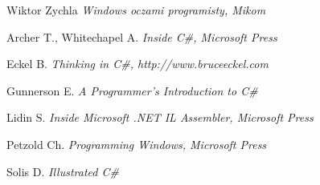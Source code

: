 \begin{thebibliography}{99999}

Wiktor Zychla {\em Windows oczami programisty, Mikom}

Archer T., Whitechapel A. {\em Inside C\#, Microsoft Press}

Eckel B. {\em Thinking in C\#, http://www.bruceeckel.com}

Gunnerson E. {\em A Programmer's Introduction to C\#}

Lidin S. {\em Inside Microsoft .NET IL Assembler, Microsoft Press}

Petzold Ch. {\em Programming Windows, Microsoft Press}

Solis D. {\em Illustrated C\#}

\end{thebibliography}
